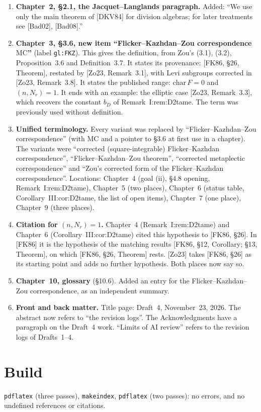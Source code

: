 \documentclass[12pt,letterpaper]{amsart}
\begin{document}
\begin{enumerate}[leftmargin=*,label=\textbf{C\arabic*.}]
\item \textbf{Chapter~2, \S2.1, the Jacquet--Langlands paragraph.} Added: ``We use only the main theorem of [DKV84] for division algebras; for later treatments see [Bad02], [Bad08].''
\item \textbf{Chapter~3, \S3.6, new item ``Flicker--Kazhdan--Zou correspondence $\mathrm{MC}$''} (label \texttt{gl:FKZ}). This gives the definition, from Zou's (3.1), (3.2), Proposition~3.6 and Definition~3.7. It states its provenance: [FK86, \S26, Theorem], restated by [Zo23, Remark~3.1], with Levi subgroups corrected in [Zo23, Remark~3.8]. It states the published range: $\mathrm{char}\,F=0$ and $(n,N_r)=1$. It ends with an example: the elliptic case [Zo23, Remark~3.3], which recovers the constant $b_D$ of Remark~I:rem:D2tame. The term was previously used without definition.
\item \textbf{Unified terminology.} Every variant was replaced by ``Flicker--Kazhdan--Zou correspondence'' (with $\mathrm{MC}$ and a pointer to \S3.6 at first use in a chapter). The variants were ``corrected (square-integrable) Flicker--Kazhdan correspondence'', ``Flicker--Kazhdan--Zou theorem'', ``corrected metaplectic correspondence'' and ``Zou's corrected form of the Flicker--Kazhdan correspondence''. Locations: Chapter~4 (goal (ii), \S4.8 opening, Remark~I:rem:D2tame), Chapter~5 (two places), Chapter~6 (status table, Corollary~III:cor:D2tame, the list of open items), Chapter~7 (one place), Chapter~9 (three places).
\item \textbf{Citation for $(n,N_r)=1$.} Chapter~4 (Remark~I:rem:D2tame) and Chapter~6 (Corollary~III:cor:D2tame) cited this hypothesis to [FK86, \S26]. In [FK86] it is the hypothesis of the matching results [FK86, \S12, Corollary; \S13, Theorem], on which [FK86, \S26, Theorem] rests. [Zo23] takes [FK86, \S26] as its starting point and adds no further hypothesis. Both places now say so.
\item \textbf{Chapter~10, glossary} (\S10.6). Added an entry for the Flicker--Kazhdan--Zou correspondence, as an independent summary.
\item \textbf{Front and back matter.} Title page: Draft~4, November~23, 2026. The abstract now refers to ``the revision logs''. The Acknowledgments have a paragraph on the Draft~4 work. ``Limits of AI review'' refers to the revision logs of Drafts~1--4.
\end{enumerate}

\section{Build}
\texttt{pdflatex} (three passes), \texttt{makeindex}, \texttt{pdflatex} (two passes): no errors, and no undefined references or citations.
\end{document}
